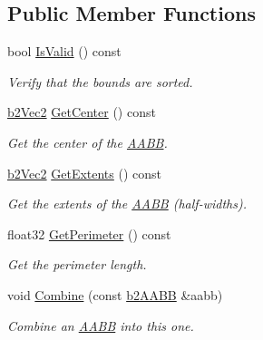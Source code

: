 \subsection*{Public Member Functions}
\begin{DoxyCompactItemize}
\item 
\mbox{\label{structb2AABB_a70bb45c086fcc2d7ee8694deb386070e}} 
bool \hyperlink{structb2AABB_a70bb45c086fcc2d7ee8694deb386070e}{Is\+Valid} () const
\begin{DoxyCompactList}\small\item\em Verify that the bounds are sorted. \end{DoxyCompactList}\item 
\mbox{\label{structb2AABB_a2c4051e79001a3166cc7f8ad811137fe}} 
\hyperlink{structb2Vec2}{b2\+Vec2} \hyperlink{structb2AABB_a2c4051e79001a3166cc7f8ad811137fe}{Get\+Center} () const
\begin{DoxyCompactList}\small\item\em Get the center of the \hyperlink{classAABB}{A\+A\+BB}. \end{DoxyCompactList}\item 
\mbox{\label{structb2AABB_a2a4f550a18d2a0895fbc5c4d3ec17d22}} 
\hyperlink{structb2Vec2}{b2\+Vec2} \hyperlink{structb2AABB_a2a4f550a18d2a0895fbc5c4d3ec17d22}{Get\+Extents} () const
\begin{DoxyCompactList}\small\item\em Get the extents of the \hyperlink{classAABB}{A\+A\+BB} (half-\/widths). \end{DoxyCompactList}\item 
\mbox{\label{structb2AABB_a25d2504d2f2fdec88f9347f62f112268}} 
float32 \hyperlink{structb2AABB_a25d2504d2f2fdec88f9347f62f112268}{Get\+Perimeter} () const
\begin{DoxyCompactList}\small\item\em Get the perimeter length. \end{DoxyCompactList}\item 
\mbox{\label{structb2AABB_ad551edba62d2ad6094672a9ba3e26496}} 
void \hyperlink{structb2AABB_ad551edba62d2ad6094672a9ba3e26496}{Combine} (const \hyperlink{structb2AABB}{b2\+A\+A\+BB} \&aabb)
\begin{DoxyCompactList}\small\item\em Combine an \hyperlink{classAABB}{A\+A\+BB} into this one. \end{DoxyCompactList}\item 

\end{DoxyCompactItemize}
